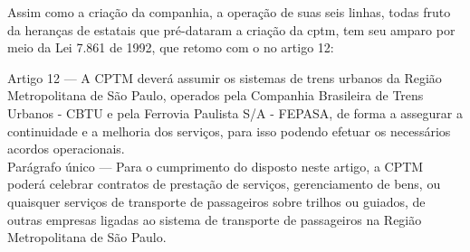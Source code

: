 %	
	
	
	Assim como a criação da companhia, a operação de suas seis linhas, todas fruto da heranças de estatais que pré-dataram a criação da {\glsdesc*{cptm}}, tem seu amparo por meio da Lei 7.861 de 1992, que retomo com o no artigo 12:
	
	\begin{citacao}
		Artigo 12 --- A CPTM deverá assumir os sistemas de trens urbanos da Região Metropolitana de São Paulo, operados pela Companhia Brasileira de Trens Urbanos - CBTU e pela Ferrovia Paulista S/A - FEPASA, de forma a assegurar a continuidade e a melhoria dos serviços, para isso podendo efetuar os necessários acordos operacionais.\\
		Parágrafo único --- Para o cumprimento do disposto neste artigo, a CPTM poderá celebrar contratos de prestação de serviços, gerenciamento de bens, ou quaisquer serviços de transporte de passageiros sobre trilhos ou guiados, de outras empresas ligadas ao sistema de transporte de passageiros na Região Metropolitana de São Paulo.\cite{lei7861}
	\end{citacao}

